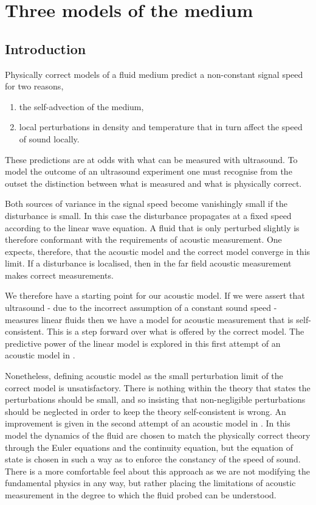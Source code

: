 

\chapter{Three models of the medium}\label{ch:medium}



\section{Introduction}
Physically correct models of a fluid medium predict a non-constant signal speed for two reasons,
\begin{enumerate}
\item the self-advection of the medium,
\item local perturbations in density and temperature that in turn affect the speed of sound locally.
\end{enumerate}
These predictions are at odds with what can be measured with ultrasound.
To model the outcome of an ultrasound experiment one must recognise from the outset the distinction between what is measured and what is physically correct.

Both sources of variance in the signal speed become vanishingly small if the disturbance is small.
In this case the disturbance propagates at a fixed speed according to the linear wave equation.
A fluid that is only perturbed slightly is therefore conformant with the requirements of acoustic measurement.
One expects, therefore,
that the acoustic model and the correct model converge in this limit.
If a disturbance is localised, then in the far field acoustic measurement makes correct measurements.

We therefore have a starting point for our acoustic model.
If we were assert that ultrasound - due to the incorrect assumption of a constant sound speed - measures linear fluids
then we have a model for acoustic measurement that is self-consistent.
This is a step forward over what is offered by the correct model.
The predictive power of the linear model is explored in this first attempt of an acoustic model in .

Nonetheless, defining acoustic model as the small perturbation limit of the correct model is unsatisfactory.
There is nothing within the theory that states the perturbations should be small,
and so insisting that non-negligible perturbations should be neglected in order to keep the
theory self-consistent is wrong.
An improvement is given in the second attempt of an acoustic model in .
In this model the dynamics of the fluid are chosen to match the physically correct theory through the Euler equations and the continuity
equation,
but the equation of state is chosen in such a way as to enforce the constancy of the speed of sound.
There is a more comfortable feel about this approach as we are not modifying the fundamental physics in any way,
but rather placing the limitations of acoustic measurement in the degree to which the fluid probed can be understood.

